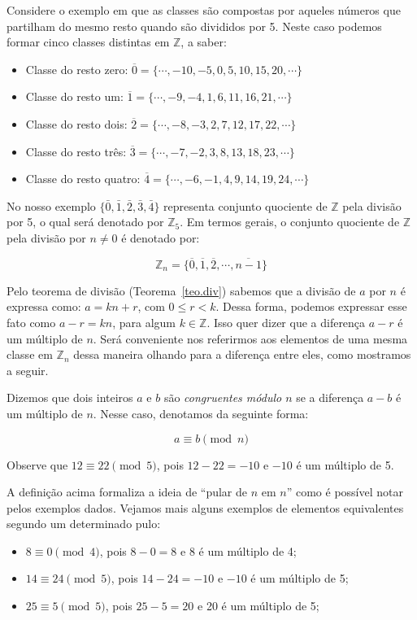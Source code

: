 	Considere o exemplo em que as classes s\~{a}o compostas por aqueles n\'{u}meros que partilham do mesmo resto quando s\~{a}o divididos por 
	5. Neste caso podemos formar cinco classes distintas em $\mathbb{Z}$, a saber:
	\begin{itemize}
		\item Classe do resto zero: $\overline{0}=\{\cdots, -10, -5, 0, 5, 10, 15, 20, \cdots\}$
		\item Classe do resto um: $\overline{1}=\{\cdots, -9, -4, 1, 6, 11, 16, 21, \cdots\}$
		\item Classe do resto dois: $\overline{2}=\{\cdots, -8, -3, 2, 7, 12, 17, 22, \cdots\}$
		\item Classe do resto tr\^{e}s: $\overline{3}=\{\cdots, -7, -2, 3, 8, 13, 18, 23, \cdots\}$
		\item Classe do resto quatro: $\overline{4}=\{\cdots, -6, -1, 4, 9, 14, 19, 24, \cdots\}$
	\end{itemize}

	
	No nosso exemplo $\{\bar{0}, \bar{1}, \bar{2}, \bar{3}, \bar{4}\}$ representa conjunto quociente 
	de $\mathbb{Z}$ pela divis\~{a}o por 5, o qual ser\'{a} denotado por $\mathbb{Z}_{5}$. Em termos gerais, 
	o conjunto quociente de $\mathbb{Z}$ pela divis\~{a}o por $n\neq 0$ \'{e} denotado por:

	$$\mathbb{Z}_{n}=\{\overline{0}, \overline{1}, \overline{2}, \cdots, \overline{n-1}\}$$ 

Pelo teorema de divis\~{a}o (Teorema~\ref{teo.div}) sabemos que a divis\~{a}o de $a$ por $n$ \'{e} expressa como:
$a=kn+r$, com $0\leq r< k$. Dessa forma, podemos expressar esse fato como $a-r=kn$, para algum $k\in\mathbb{Z}$. Isso 
quer dizer que a diferen\c{c}a $a-r$ \'{e} um m\'{u}ltiplo de $n$. Ser\'{a} conveniente nos referirmos aos elementos 
de uma mesma classe em $\mathbb{Z}_{n}$ dessa maneira olhando para a diferen\c{c}a entre eles, como mostramos a seguir. 
   
Dizemos que dois inteiros $a$ e $b$ s\~{a}o \textit{congruentes m\'{o}dulo $n$} se a diferen\c{c}a $a-b$ \'{e} um 
m\'{u}ltiplo de $n$. Nesse caso, denotamos da seguinte forma:

$$a \equiv b \pmod{n}$$ 

Observe que $12 \equiv 22 \pmod{5}$, pois $12-22=-10$ e $-10$ \'{e} um m\'{u}ltiplo de 5. 

A defini\c{c}\~{a}o acima formaliza a ideia de ``pular de $n$ em $n$'' como \'{e} poss\'{i}vel notar 
pelos exemplos dados. Vejamos mais alguns exemplos de elementos equivalentes segundo um determinado pulo:
\begin{itemize}
	\item $8 \equiv 0 \pmod{4}$, pois $8-0=8$ e 8 \'{e} um m\'{u}ltiplo de 4;
	\item $14 \equiv 24  \pmod{5}$, pois $14-24=-10$ e $-10$ \'{e} um m\'{u}ltiplo de 5;
	\item $25 \equiv 5 \pmod{5}$, pois $25-5=20$ e 20 \'{e} um m\'{u}ltiplo de 5;
\end{itemize}

